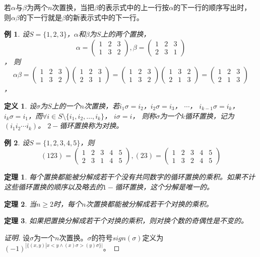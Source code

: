 \documentclass{book}[oneside]
\newtheorem{Def}{定义}[chapter]
\newtheorem{Thm}{定理}[chapter]
\newtheorem*{Example}{例}
\begin{document}
\begin{CJK*}{UTF8}{gbsn}
   若$\alpha$与$\beta$为两个$n$次置换，当把$\beta$的表示式中的上一行按$\alpha$的下一行的顺序写出时，则$\alpha \beta$的下一行就是$\beta$的新表示式中的下一行。
  \begin{Example}
    设$S=\{1,2,3\}$，$\alpha$和$\beta$为$S$上的两个置换，
    \[\alpha=\begin{pmatrix}1&2&3\\1&3&2\end{pmatrix},\beta=\begin{pmatrix}1&2&3\\2&3&1\end{pmatrix}\]，
    则
    \[\alpha\beta=\begin{pmatrix}1&2&3\\1&3&2\end{pmatrix}\begin{pmatrix}1&2&3\\2&3&1\end{pmatrix}=\begin{pmatrix}1&2&3\\1&3&2\end{pmatrix}\begin{pmatrix}1&3&2\\2&1&3\end{pmatrix}=\begin{pmatrix}1&2&3\\2&1&3\end{pmatrix}\]，    
  \end{Example}   
   \begin{Def}
     设$\sigma$为$S$上的一个$n$次置换，若$i_1\sigma=i_2$，$i_2\sigma = i_3$， $\cdots$， $i_{k-1}\sigma = i_k$， $i_k\sigma = i_1$，而$\forall i \in S\setminus \{i_1, i_2, \ldots, i_k\}$， $i\sigma = i$，
     则称$\sigma$为一个$k$循环置换，记为$(i_1i_2\cdots i_k)$。 $2-$循环置换称为对换。
   \end{Def}
   \begin{Example}
   设$S=\{1,2,3,4,5\}$，则\[(1 2 3)=\begin{pmatrix}1&2&3&4&5\\2&3&1&4&5\end{pmatrix},(2 3)=\begin{pmatrix}1&2&3&4&5\\1&3&2&4&5\end{pmatrix}\]     
   \end{Example}
   \begin{Thm}
    每个置换都能被分解成若干个没有共同数字的循环置换的乘积。如果不计这些循环置换的顺序以及略去的$1-$循环置换，这个分解是唯一的。
   \end{Thm}
   \begin{Thm}
    当$n\geq 2$时，每个$n$次置换都能被分解成若干个对换的乘积。
   \end{Thm}
   \begin{Thm}
    如果把置换分解成若干个对换的乘积，则对换个数的奇偶性是不变的。
  \end{Thm}
  \begin{proof}[证明]
    设$\sigma$为一个$n$次置换。$\sigma$的符号$sign(\sigma)$定义为$(-1)^{|\{(x,y)|x < y \land (x)\sigma > (y)\sigma \}|}$。


\end{proof}
\end{CJK*}
\end{document}
